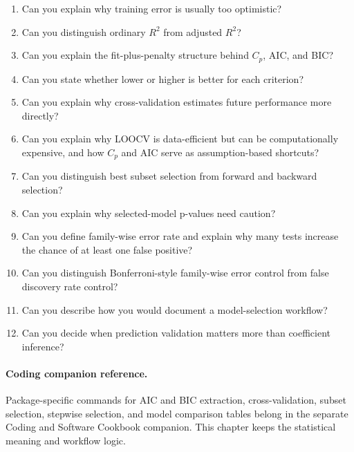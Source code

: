 \begin{enumerate}
  \item Can you explain why training error is usually too optimistic?
  \item Can you distinguish ordinary \(R^2\) from adjusted \(R^2\)?
  \item Can you explain the fit-plus-penalty structure behind \(C_p\), AIC, and BIC?
  \item Can you state whether lower or higher is better for each criterion?
  \item Can you explain why cross-validation estimates future performance more directly?
  \item Can you explain why LOOCV is data-efficient but can be computationally expensive, and how \(C_p\) and AIC serve as assumption-based shortcuts?
  \item Can you distinguish best subset selection from forward and backward selection?
  \item Can you explain why selected-model p-values need caution?
  \item Can you define family-wise error rate and explain why many tests increase the chance of at least one false positive?
  \item Can you distinguish Bonferroni-style family-wise error control from false discovery rate control?
  \item Can you describe how you would document a model-selection workflow?
  \item Can you decide when prediction validation matters more than coefficient inference?
\end{enumerate}

\paragraph{Coding companion reference.}
Package-specific commands for AIC and BIC extraction, cross-validation, subset selection, stepwise selection, and model comparison tables belong in the separate Coding and Software Cookbook companion.  This chapter keeps the statistical meaning and workflow logic.
